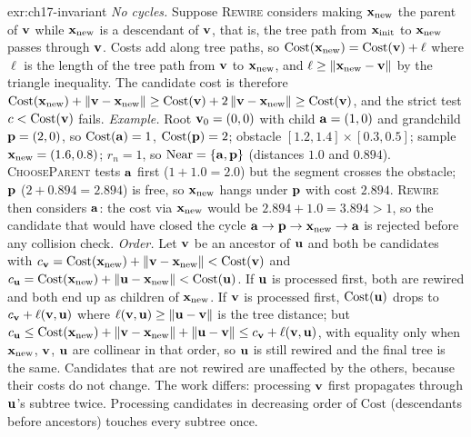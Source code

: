 \begin{solution}{exr:ch17-invariant}
\emph{No cycles.} Suppose \textsc{Rewire} considers making $\mathbf{x}_{\mathrm{new}}$ the parent of $\mathbf{v}$ while $\mathbf{x}_{\mathrm{new}}$ is a descendant of $\mathbf{v}$, that is, the tree path from $\mathbf{x}_{\mathrm{init}}$ to $\mathbf{x}_{\mathrm{new}}$ passes through $\mathbf{v}$. Costs add along tree paths, so $\mathrm{Cost}(\mathbf{x}_{\mathrm{new}})=\mathrm{Cost}(\mathbf{v})+\ell$ where $\ell$ is the length of the tree path from $\mathbf{v}$ to $\mathbf{x}_{\mathrm{new}}$, and $\ell\ge\left\lVert \mathbf{x}_{\mathrm{new}}-\mathbf{v} \right\rVert$ by the triangle inequality. The candidate cost is therefore $\mathrm{Cost}(\mathbf{x}_{\mathrm{new}})+\left\lVert \mathbf{v}-\mathbf{x}_{\mathrm{new}} \right\rVert\ge\mathrm{Cost}(\mathbf{v})+2\left\lVert \mathbf{v}-\mathbf{x}_{\mathrm{new}} \right\rVert\ge\mathrm{Cost}(\mathbf{v})$, and the strict test $c<\mathrm{Cost}(\mathbf{v})$ fails. \emph{Example.} Root $\mathbf{v}_0=(0,0)$ with child $\mathbf{a}=(1,0)$ and grandchild $\mathbf{p}=(2,0)$, so $\mathrm{Cost}(\mathbf{a})=1$, $\mathrm{Cost}(\mathbf{p})=2$; obstacle $[1.2,1.4]\times[0.3,0.5]$; sample $\mathbf{x}_{\mathrm{new}}=(1.6,0.8)$; $r_n=1$, so $\operatorname{Near}=\left\{ \mathbf{a},\mathbf{p} \right\}$ (distances $1.0$ and $0.894$). \textsc{ChooseParent} tests $\mathbf{a}$ first ($1+1.0=2.0$) but the segment crosses the obstacle; $\mathbf{p}$ ($2+0.894=2.894$) is free, so $\mathbf{x}_{\mathrm{new}}$ hangs under $\mathbf{p}$ with cost $2.894$. \textsc{Rewire} then considers $\mathbf{a}$: the cost via $\mathbf{x}_{\mathrm{new}}$ would be $2.894+1.0=3.894>1$, so the candidate that would have closed the cycle $\mathbf{a}\to\mathbf{p}\to\mathbf{x}_{\mathrm{new}}\to\mathbf{a}$ is rejected before any collision check.
\emph{Order.} Let $\mathbf{v}$ be an ancestor of $\mathbf{u}$ and both be candidates with $c_{\mathbf{v}}=\mathrm{Cost}(\mathbf{x}_{\mathrm{new}})+\left\lVert \mathbf{v}-\mathbf{x}_{\mathrm{new}} \right\rVert<\mathrm{Cost}(\mathbf{v})$ and $c_{\mathbf{u}}=\mathrm{Cost}(\mathbf{x}_{\mathrm{new}})+\left\lVert \mathbf{u}-\mathbf{x}_{\mathrm{new}} \right\rVert<\mathrm{Cost}(\mathbf{u})$. If $\mathbf{u}$ is processed first, both are rewired and both end up as children of $\mathbf{x}_{\mathrm{new}}$. If $\mathbf{v}$ is processed first, $\mathrm{Cost}(\mathbf{u})$ drops to $c_{\mathbf{v}}+\ell(\mathbf{v},\mathbf{u})$ where $\ell(\mathbf{v},\mathbf{u})\ge\left\lVert \mathbf{u}-\mathbf{v} \right\rVert$ is the tree distance; but $c_{\mathbf{u}}\le\mathrm{Cost}(\mathbf{x}_{\mathrm{new}})+\left\lVert \mathbf{v}-\mathbf{x}_{\mathrm{new}} \right\rVert+\left\lVert \mathbf{u}-\mathbf{v} \right\rVert\le c_{\mathbf{v}}+\ell(\mathbf{v},\mathbf{u})$, with equality only when $\mathbf{x}_{\mathrm{new}}$, $\mathbf{v}$, $\mathbf{u}$ are collinear in that order, so $\mathbf{u}$ is still rewired and the final tree is the same. Candidates that are not rewired are unaffected by the others, because their costs do not change. The work differs: processing $\mathbf{v}$ first propagates through $\mathbf{u}$'s subtree twice. Processing candidates in decreasing order of $\mathrm{Cost}$ (descendants before ancestors) touches every subtree once.
\end{solution}

